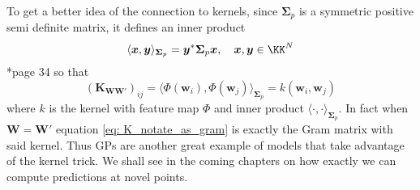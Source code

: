 To get a better idea of the connection to kernels, since $\bm{\Sigma}_p$ is a symmetric positive semi definite matrix, it defines an inner product
\[
    \langle \bm{x} , \bm{y} \rangle_{\bm{\Sigma}_p} = \bm{y}^{\ast} \bm{\Sigma}_p \bm{x}, \quad \bm{x} , \bm{y} \in \KK^{N}
\]
\cite{WangGuorongGITa}*{page 34} so that
\begin{equation} \label{eq: K_notate_as_gram}
    \left( \bm{K}_{\bm{W} \bm{W}'} \right)_{ij} = \langle \Phi \left( \bm{w}_i \right) ,\Phi \left( \bm{w}_j \right) \rangle_{\bm{\Sigma}_p} = k \left( \bm{w}_i , \bm{w}_j \right)
\end{equation}
where $k$ is the kernel with feature map $\Phi$ and inner product $\langle \cdot , \cdot \rangle_{\bm{\Sigma}_p}$. In fact when $\bm{W} = \bm{W}'$ equation \ref{eq: K_notate_as_gram} is exactly the Gram matrix with said kernel. Thus GPs are another great example of models that take advantage of the kernel trick. We shall see in the coming chapters on how exactly we can compute predictions at novel points.